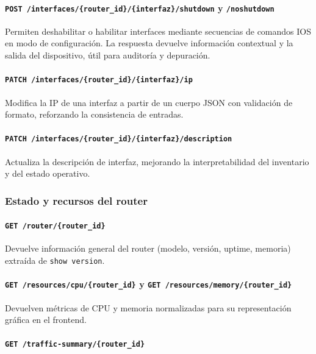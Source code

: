 \paragraph*{\texttt{POST /interfaces/\{router\_id\}/\{interfaz\}/shutdown} \;\; y \;\; \texttt{/noshutdown}}


Permiten deshabilitar o habilitar interfaces mediante secuencias de comandos IOS en modo de configuración. La respuesta devuelve información 
contextual y la salida del dispositivo, útil para auditoría y depuración.

\paragraph*{\texttt{PATCH /interfaces/\{router\_id\}/\{interfaz\}/ip}}


Modifica la IP de una interfaz a partir de un cuerpo JSON con validación de formato, reforzando la consistencia de entradas.

\paragraph*{\texttt{PATCH /interfaces/\{router\_id\}/\{interfaz\}/description}}

Actualiza la descripción de interfaz, mejorando la interpretabilidad del inventario y del estado operativo.

\subsubsection*{Estado y recursos del router}

\paragraph*{\texttt{GET /router/\{router\_id\}}}

Devuelve información general del router (modelo, versión, uptime, memoria) extraída de \texttt{show version}.

\paragraph*{\texttt{GET /resources/cpu/\{router\_id\}} \;\; y \;\; \texttt{GET /resources/memory/\{router\_id\}}}
Devuelven métricas de CPU y memoria normalizadas para su representación gráfica en el frontend.

\paragraph*{\texttt{GET /traffic-summary/\{router\_id\}}}

